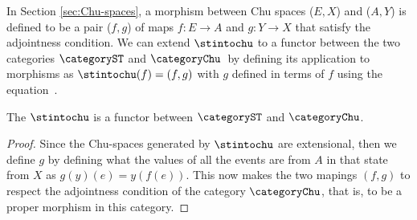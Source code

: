 


    
    In Section \ref{sec:Chu-spaces}, a morphism between Chu spaces ($E, X$) and ($A, Y$) is defined to be a pair ($f, g$) of maps $f : E \to A$ and $g: Y \to X$ that satisfy the adjointness condition. We can extend $\stintochu$ to a functor between the two categories $\categoryST$ and $\categoryChu$\ by defining its application to morphisms as $\stintochu(f)=(f,g)$ with $g$ defined in terms of $f$ using the equation~.

    \begin{lemma}
        The $\stintochu$ is a functor between $\categoryST$ and $\categoryChu$.
    \end{lemma}

    \begin{proof}
        Since the Chu-spaces generated by $\stintochu$ are extensional, then we define $g$ by defining what the values of all the events are from $A$ in that state from $X$ as $g(y)(e)=y(f(e))$. This now makes the two mapings $(f,g)$ to respect the adjointness condition of the category $\categoryChu$, that is, to be a proper morphism in this category.
    \end{proof}

